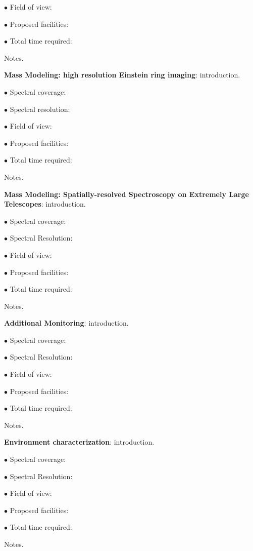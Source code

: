 $\bullet$ Field of view:

$\bullet$ Proposed facilities:

$\bullet$ Total time required:

Notes.


{\bf Mass Modeling: high resolution Einstein ring imaging}: introduction.

$\bullet$ Spectral coverage:

$\bullet$ Spectral resolution:

$\bullet$ Field of view:

$\bullet$ Proposed facilities:

$\bullet$ Total time required:

Notes.


{\bf Mass Modeling: Spatially-resolved
Spectroscopy on Extremely Large Telescopes}: introduction.

$\bullet$ Spectral coverage:

$\bullet$ Spectral Resolution:

$\bullet$ Field of view:

$\bullet$ Proposed facilities:

$\bullet$ Total time required:

Notes.


{\bf Additional Monitoring}: introduction.

$\bullet$ Spectral coverage:

$\bullet$ Spectral Resolution:

$\bullet$ Field of view:

$\bullet$ Proposed facilities:

$\bullet$ Total time required:

Notes.


{\bf Environment characterization}: introduction.

$\bullet$ Spectral coverage:

$\bullet$ Spectral Resolution:

$\bullet$ Field of view:

$\bullet$ Proposed facilities:

$\bullet$ Total time required:

Notes.


